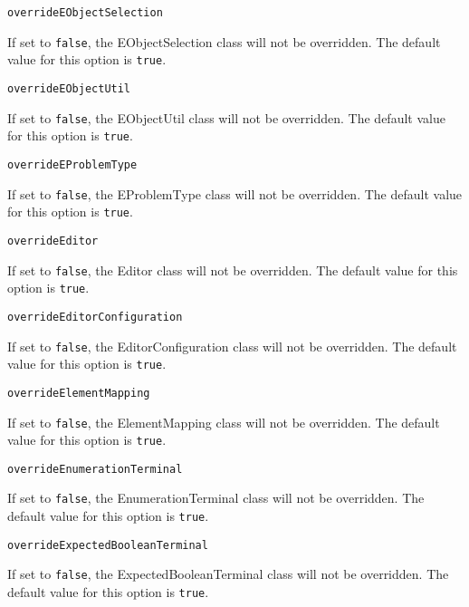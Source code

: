 \noindent\texttt{overrideEObjectSelection}
\begin{myindentpar}{1cm}
If set to \texttt{false}, the EObjectSelection class will not be overridden. The default value for this option is \texttt{true}.
\end{myindentpar}

\noindent\texttt{overrideEObjectUtil}
\begin{myindentpar}{1cm}
If set to \texttt{false}, the EObjectUtil class will not be overridden. The default value for this option is \texttt{true}.
\end{myindentpar}

\noindent\texttt{overrideEProblemType}
\begin{myindentpar}{1cm}
If set to \texttt{false}, the EProblemType class will not be overridden. The default value for this option is \texttt{true}.
\end{myindentpar}

\noindent\texttt{overrideEditor}
\begin{myindentpar}{1cm}
If set to \texttt{false}, the Editor class will not be overridden. The default value for this option is \texttt{true}.
\end{myindentpar}

\noindent\texttt{overrideEditorConfiguration}
\begin{myindentpar}{1cm}
If set to \texttt{false}, the EditorConfiguration class will not be overridden. The default value for this option is \texttt{true}.
\end{myindentpar}

\noindent\texttt{overrideElementMapping}
\begin{myindentpar}{1cm}
If set to \texttt{false}, the ElementMapping class will not be overridden. The default value for this option is \texttt{true}.
\end{myindentpar}

\noindent\texttt{overrideEnumerationTerminal}
\begin{myindentpar}{1cm}
If set to \texttt{false}, the EnumerationTerminal class will not be overridden. The default value for this option is \texttt{true}.
\end{myindentpar}

\noindent\texttt{overrideExpectedBooleanTerminal}
\begin{myindentpar}{1cm}
If set to \texttt{false}, the ExpectedBooleanTerminal class will not be overridden. The default value for this option is \texttt{true}.
\end{myindentpar}

